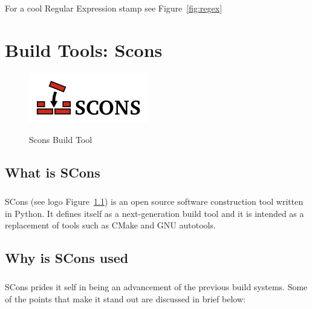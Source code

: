 \documentclass[a4paper,11pt]{report}
\begin{document}
For a cool Regular Expression stamp see Figure~\ref{fig:regex}




\chapter {Build Tools: Scons}

\begin{figure}[h]
	\centering
		\includegraphics{images/scons-logo-transparent.png}~\\[1cm]
		\caption{Scons Build Tool}
		\label{fig:scons}
\end{figure}

\section{What is SCons}

\paragraph{}

SCons (see logo Figure~\ref{fig:scons}) is an open source software construction tool written in Python. It defines itself as a next-generation build tool and it is intended as a replacement of tools such as CMake and GNU autotools. 

\section{Why is SCons used}

\paragraph{}

SCons prides it self in being an advancement of the previous build systems. Some of the points that make it stand out are discussed in brief below:
\end{document}
